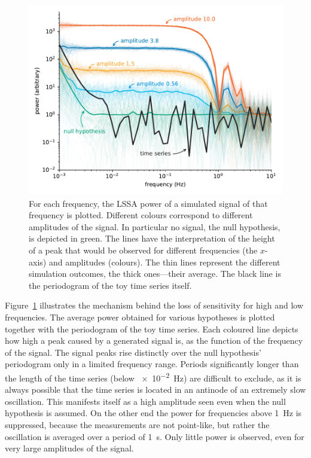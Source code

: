 \begin{figure}
  \centering \includegraphics[width=\linewidth]{gfx/axions/basic_exclusion_sensitivity.pdf}
  \caption{For each frequency, the LSSA power of a simulated signal of that frequency is plotted.
  Different colours correspond to different amplitudes of the signal.
  In particular no signal, the null hypothesis, is depicted in green.
  The lines have the interpretation of the height of a peak that would be observed for different frequencies (the $x$-axis) and amplitudes (colours).
  The thin lines represent the different simulation outcomes, the thick ones---their average.
  The black line is the periodogram of the toy time series itself.}\label{fig:sensitivity}
\end{figure}

Figure~\ref{fig:sensitivity} illustrates the mechanism behind the loss of sensitivity for high and low frequencies.
The average power obtained for various hypotheses is plotted together with the periodogram of the toy time series.
Each coloured line depicts how high a peak caused by a generated signal is, as the function of the frequency of the signal.
The signal peaks rise distinctly over the null hypothesis' periodogram only in a limited frequency range.
Periods significantly longer than the length of the time series (below \SI{e-2}{\hertz}) are difficult to exclude, as it is always possible that the time series is located in an antinode of an extremely slow oscillation.
This manifests itself as a high amplitude seen even when the null hypothesis is assumed.
On the other end the power for frequencies above \SI{1}{\hertz} is suppressed, because the measurements are not point-like, but rather the oscillation is averaged over a period of \SI{1}{\second}.
Only little power is observed, even for very large amplitudes of the signal.

